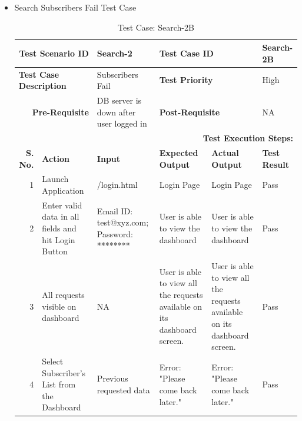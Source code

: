 \documentclass[a4paper, hidelinks, 12pt]{report}
\begin{document}
\begin{itemize}
\item{Search Subscribers Fail Test Case}
\begin{table}[H]
  \centering
  \caption{Test Case: Search-2B}
    \begin{tabular}{|r|p{4.355em}|p{7.715em}|p{6.43em}|p{5.855em}|p{5.07em}|}
    \toprule
    \multicolumn{2}{|p{13.425em}|}{\textbf{Test Scenario ID}} & Search-2 & \multicolumn{2}{p{12.285em}|}{\textbf{Test Case ID}} & Search-2B \\
    \midrule
    \multicolumn{2}{|l|}{\multirow{2}[2]{*}{\textbf{Test Case Description}}} & \multirow{2}[2]{*}{Subscribers Fail} & \multicolumn{2}{l|}{\multirow{2}[2]{*}{\textbf{Test Priority}}} & \multirow{2}[2]{*}{High} \\
    \multicolumn{2}{|l|}{} & \multicolumn{1}{l|}{} & \multicolumn{2}{l|}{} & \multicolumn{1}{l|}{} \\
    \midrule
    \multicolumn{2}{|p{13.425em}|}{\textbf{Pre-Requisite}} & DB server is down after user logged in & \multicolumn{2}{p{12.285em}|}{\textbf{Post-Requisite}} & NA \\
    \midrule
    \multicolumn{6}{p{38.495em}|}{\textbf{Test Execution Steps:}} \\
    \midrule
    \multicolumn{1}{|p{5.07em}|}{\textbf{S. No.}} & \textbf{Action } & \textbf{Input} & \textbf{Expected Output} & \textbf{Actual Output} & \textbf{Test Result} \\
    \midrule
    1     & Launch Application & /login.html & Login Page & Login Page & Pass \\
    \midrule
    2     & Enter valid data in all fields and hit Login Button & Email ID: test@xyz.com; Password: ******** & User is able to view the dashboard & User is able to view the dashboard & Pass \\
    \midrule
    3     & All requests visible on dashboard & NA    & User is able to view all the requests available on its dashboard screen. & User is able to view all the requests available on its dashboard screen. & Pass \\
    \midrule
    4     & Select Subscriber's List from the Dashboard & Previous requested data & Error: "Please come back later." & Error: "Please come back later." & Pass \\
    \bottomrule
    \end{tabular}%
  \label{tab:Test Case: Search-2B}%
\end{table}%
\end{itemize}
\end{document}
